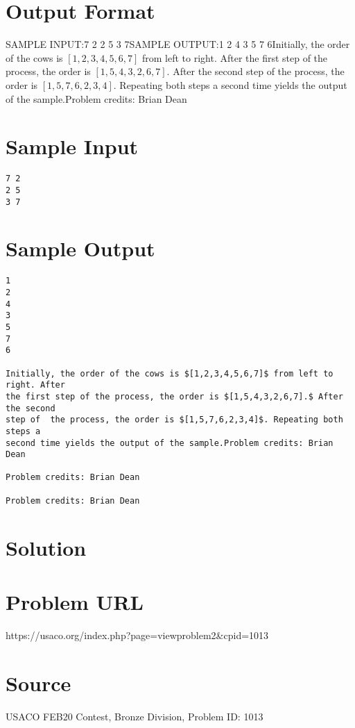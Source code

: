 \documentclass[12pt]{article}
\begin{document}
\section*{Output Format}
SAMPLE INPUT:7 2
2 5
3 7SAMPLE OUTPUT:1
2
4
3
5
7
6Initially, the order of the cows is $[1,2,3,4,5,6,7]$ from left to right. After
the first step of the process, the order is $[1,5,4,3,2,6,7].$ After the second
step of  the process, the order is $[1,5,7,6,2,3,4]$. Repeating both steps a
second time yields the output of the sample.Problem credits: Brian Dean

\section*{Sample Input}
\begin{verbatim}
7 2
2 5
3 7
\end{verbatim}

\section*{Sample Output}
\begin{verbatim}
1
2
4
3
5
7
6

Initially, the order of the cows is $[1,2,3,4,5,6,7]$ from left to right. After
the first step of the process, the order is $[1,5,4,3,2,6,7].$ After the second
step of  the process, the order is $[1,5,7,6,2,3,4]$. Repeating both steps a
second time yields the output of the sample.Problem credits: Brian Dean

Problem credits: Brian Dean

Problem credits: Brian Dean
\end{verbatim}

\section*{Solution}


\section*{Problem URL}
https://usaco.org/index.php?page=viewproblem2&cpid=1013

\section*{Source}
USACO FEB20 Contest, Bronze Division, Problem ID: 1013
\end{document}
